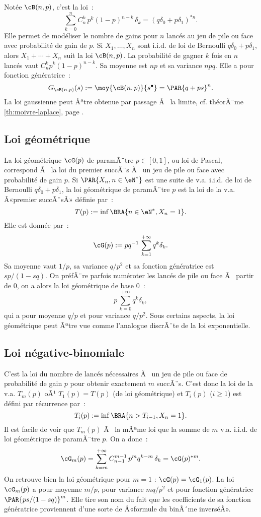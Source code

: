 {{Notée $\cB(n,p)$, c'est la loi~:
$$
\sum_{k=0}^n C_n^k\,p^k(1-p)^{n-k}\,\delta_k=(q\delta_0+p\delta_1)^{*n}.
$$
Elle permet de modéliser le nombre de gains pour $n$ lancés au jeu de pile
ou face avec probabilité de gain de $p$. Si $X_1,\ldots,X_n$ sont i.i.d. de loi de
Bernoulli $q\delta_0+p\delta_1$, alors $X_1+\cdots+X_n$ suit la loi $\cB(n,p)$. La
probabilité de gagner $k$ fois en $n$ lancés vaut $C_n^k p^k(1-p)^{n-k}$. Sa
moyenne est $np$ et sa variance $npq$. Elle a pour fonction génératrice~:
$$
G_{\cB(n,p)}(s):=\moy{\cB(n,p)}{s^\bullet}=\PAR{q+ps}^n.
$$
La loi gaussienne peut Ãªtre obtenue par passage Ã  la limite, cf. théorÃ¨me
\ref{th:moivre-laplace}, page \pageref{th:moivre-laplace}.

%
\subsection{Loi géométrique}\label{ss:loi:geometrique}
%

La loi géométrique $\cG(p)$ de paramÃ¨tre $p\in[0,1]$, ou loi de Pascal,
correspond Ã  la loi du premier succÃ¨s Ã  un jeu de pile ou face avec
probabilité de gain $p$. Si $\PAR{X_n,n\in\eN^*}$ est une suite de v.a. i.i.d.
de loi de Bernoulli $q\delta_0+p\delta_1$, la loi géométrique de paramÃ¨tre $p$ est
la loi de la v.a. Â«premier succÃ¨sÂ» définie par~:
$$
T(p):=\inf\BRA{n\in\eN^*, X_n=1}.
$$
Elle est donnée par~:
$$
\cG(p):=pq^{-1}\,\sum_{k=1}^{+\infty} q^k\delta_k.
$$
Sa moyenne vaut $1/p$, sa variance $q/p^2$ et sa fonction génératrice est
$sp/(1-sq)$. On préfÃ¨re parfois numéroter les lancés de pile ou face Ã  partir
de $0$, on a alors la loi géométrique de base $0$~:
$$
p\,\sum_{k=0}^{+\infty} q^k\delta_k,
$$
qui a pour moyenne $q/p$ et pour variance $q/p^2$.
Sous certains aspects, la loi géométrique peut Ãªtre vue
comme l'analogue discrÃ¨te de la loi exponentielle. 

%
\subsection{Loi négative-binomiale}\label{ss:loi:negative-binomiale}
%

C'est la loi du nombre de lancés nécessaires Ã  un jeu de pile ou face de
probabilité de gain $p$ pour obtenir exactement $m$ succÃ¨s.  C'est donc la loi
de la v.a. $T_m(p)$ oÃ¹ $T_1(p)=T(p)$ (de loi géométrique) et $T_i(p)$ ($i\geq 1$) est
défini par récurrence par~:
$$
T_i(p):=\inf\BRA{n>T_{i-1}, X_n=1}.
$$
Il est facile de voir que $T_m(p)$ Ã  la mÃªme loi que la somme de $m$ v.a.
i.i.d. de loi géométrique de paramÃ¨tre $p$. On a donc~:
$$
\cG_m(p)= \sum_{k=m}^{+\infty} C_{n-1}^{m-1}\,p^m q^{k-m} \,\delta_k
= \cG(p)^{*m}.
$$
On retrouve bien la loi géométrique pour $m=1$ : $\cG(p)=\cG_1(p)$. La loi
$\cG_m(p)$ a pour moyenne $m/p$, pour variance $mq/p^2$ et pour fonction
génératrice $\PAR{ps/(1-sq)}^m$. Elle tire son nom du fait que les
coefficients de sa fonction génératrice proviennent d'une sorte de Â«formule du
binÃ´me inverséÂ».

}}
